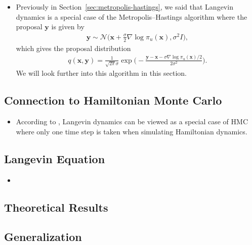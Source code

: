 \documentclass[10pt]{article}
\newcommand{\ve}[1]{\mathbf{#1}}
\newcommand{\mcal}[1]{\mathcal{#1}}
\begin{document}
\begin{itemize}
  \item Previously in Section~\ref{sec:metropolis-hastings}, we said that Langevin dynamics is a special case of the Metropolis--Hastings algorithm where the proposal $\ve{y}$ is given by
  \begin{align*}
    \ve{y} \sim \mcal{N}\bigg( \ve{x} + \frac{\sigma}{2} \nabla \log \pi_u(\ve{x}), \sigma^2 I \bigg),
  \end{align*}
  which gives the proposal distribution
  \begin{align*}
    q(\ve{x},\ve{y}) = \frac{1}{\sqrt{2\pi} \sigma} \exp\bigg( - \frac{\ve{y} - \ve{x} - \sigma \nabla \log \pi_u(\ve{x})/2}{2\sigma^2} \bigg).
  \end{align*}
  We will look further into this algorithm in this section.
\end{itemize}

\subsection{Connection to Hamiltonian Monte Carlo}

\begin{itemize}
  \item According to \cite{Neal:2011}, Langevin dynamics can be viewed as a special case of HMC where only one time step is taken when simulating Hamiltonian dynamics.
\end{itemize}

\subsection{Langevin Equation}

\begin{itemize}
  \item 
\end{itemize}

\subsection{Theoretical Results}

\subsection{Generalization}


  
\end{document}
